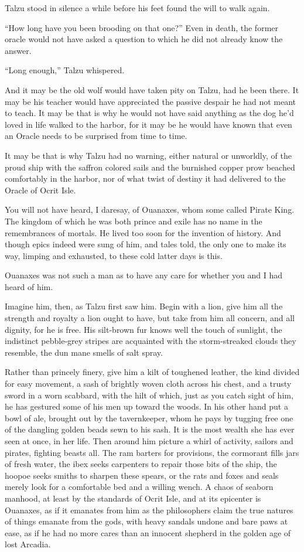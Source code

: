 Talzu stood in silence a while before his feet found the will to walk again.

``How long have you been brooding on that one?'' Even in death, the former oracle would not have asked a question to which he did not already know the answer.

``Long enough,'' Talzu whispered.

And it may be the old wolf would have taken pity on Talzu, had he been there. It may be his teacher would have appreciated the passive despair he had not meant to teach. It may be that is why he would not have said anything as the dog he'd loved in life walked to the harbor, for it may be he would have known that even an Oracle needs to be surprised from time to time.

It may be that is why Talzu had no warning, either natural or unworldly, of the proud ship with the saffron colored sails and the burnished copper prow beached comfortably in the harbor, nor of what twist of destiny it had delivered to the Oracle of Ocrit Isle.

\secdiv

You will not have heard, I daresay, of Ouanaxes, whom some called Pirate King. The kingdom of which he was both prince and exile has no name in the remembrances of mortals. He lived too soon for the invention of history. And though epics indeed were sung of him, and tales told, the only one to make its way, limping and exhausted, to these cold latter days is this.

Ouanaxes was not such a man as to have any care for whether you and I had heard of him.

Imagine him, then, as Talzu first saw him. Begin with a lion, give him all the strength and royalty a lion ought to have, but take from him all concern, and all dignity, for he is free. His silt-brown fur knows well the touch of sunlight, the indistinct pebble-grey stripes are acquainted with the storm-streaked clouds they resemble, the dun mane smells of salt spray.

Rather than princely finery, give him a kilt of toughened leather, the kind divided for easy movement, a sash of brightly woven cloth across his chest, and a trusty sword in a worn scabbard, with the hilt of which, just as you catch sight of him, he has gestured some of his men up toward the woods. In his other hand put a bowl of ale, brought out by the tavernkeeper, whom he pays by tugging free one of the dangling golden beads sewn to his sash. It is the most wealth she has ever seen at once, in her life. Then around him picture a whirl of activity, sailors and pirates, fighting beasts all. The ram barters for provisions, the cormorant fills jars of fresh water, the ibex seeks carpenters to repair those bits of the ship, the hoopoe seeks smiths to sharpen these spears, or the rats and foxes and seals merely look for a comfortable bed and a willing wench. A chaos of seaborn manhood, at least by the standards of Ocrit Isle, and at its epicenter is Ouanaxes, as if it emanates from him as the philosophers claim the true natures of things emanate from the gods, with heavy sandals undone and bare paws at ease, as if he had no more cares than an innocent shepherd in the golden age of lost Arcadia.

